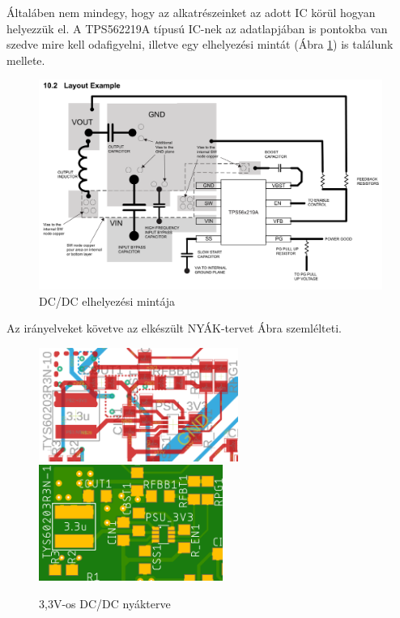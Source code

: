 \documentclass[../main.tex]{subfiles}
\begin{document}
            Általáben nem mindegy, hogy az alkatrészeinket az adott IC körül hogyan helyezzük el. A TPS562219A típusú IC-nek az adatlapjában is pontokba van szedve mire kell odafigyelni, illetve egy elhelyezési mintát (Ábra \ref{fig:tps_logl_example}) is találunk mellete.
            
            \begin{figure}[h!]
                \centering
                    \includegraphics[width=12cm]{resources/pcb_res/tps_logl_example.png}
                \caption{DC/DC elhelyezési mintája}
                \label{fig:tps_logl_example}
            \end{figure}
            
            Az irányelveket követve az elkészült NYÁK-tervet  Ábra szemlélteti.
            
            \begin{figure}[h!]
                \centering
                    \includegraphics[width=6.5cm]{resources/pcb_res/board_dcdc_3v3.png}
                    \includegraphics[width=6cm]{resources/pcb_res/pcb_dcdc_3v3.png}
                \caption{3,3V-os DC/DC nyákterve}
                \label{fig:pcb_3v3}
            \end{figure}
            
\end{document}
